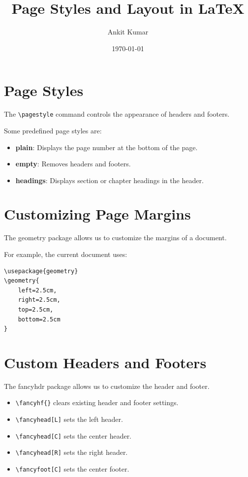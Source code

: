 \documentclass[12pt,a4paper]{article}
\title{Page Styles and Layout in LaTeX}
\author{Ankit Kumar}
\date{\today}
\begin{document}
\maketitle

\section{Page Styles}

The \texttt{\textbackslash pagestyle} command
controls the appearance of headers and footers.

Some predefined page styles are:

\begin{itemize}
    \item \textbf{plain}: Displays the page number
    at the bottom of the page.

    \item \textbf{empty}: Removes headers and footers.

    \item \textbf{headings}: Displays section or
    chapter headings in the header.
\end{itemize}

\section{Customizing Page Margins}

The geometry package allows us to customize
the margins of a document.

For example, the current document uses:

\begin{verbatim}
\usepackage{geometry}
\geometry{
    left=2.5cm,
    right=2.5cm,
    top=2.5cm,
    bottom=2.5cm
}
\end{verbatim}

\section{Custom Headers and Footers}

The fancyhdr package allows us to customize
the header and footer.

\begin{itemize}
    \item \texttt{\textbackslash fancyhf\{\}} clears
    existing header and footer settings.

    \item \texttt{\textbackslash fancyhead[L]}
    sets the left header.

    \item \texttt{\textbackslash fancyhead[C]}
    sets the center header.

    \item \texttt{\textbackslash fancyhead[R]}
    sets the right header.

    \item \texttt{\textbackslash fancyfoot[C]}
    sets the center footer.
\end{itemize}
\end{document}

